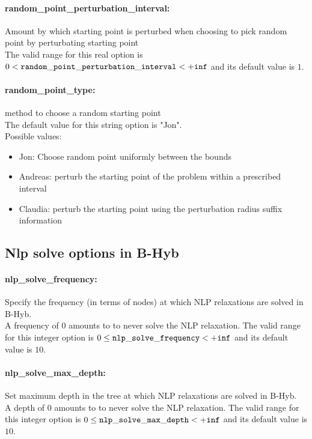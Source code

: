 \paragraph{random\_point\_perturbation\_interval:} Amount by which starting point is perturbed when choosing to pick random point by perturbating starting point $\;$ \\
 The valid range for this real option is 
$0 <  {\tt random\_point\_perturbation\_interval } <  {\tt +inf}$
and its default value is $1$.


\paragraph{random\_point\_type:} method to choose a random starting point $\;$ \\

The default value for this string option is "Jon".
\\ 
Possible values:
\begin{itemize}
   \item Jon: Choose random point uniformly between the bounds
   \item Andreas: perturb the starting point of the problem
within a prescribed interval
   \item Claudia: perturb the starting point using the
perturbation radius suffix information
\end{itemize}

\subsection{Nlp solve options in B-Hyb}
\label{sec:Nlp_solve_options_in_B-Hyb}
\paragraph{nlp\_solve\_frequency:} Specify the frequency (in terms of nodes) at which NLP relaxations are solved in B-Hyb. $\;$ \\
 A frequency of 0 amounts to to never solve the
NLP relaxation. The valid range for this integer option is
$0 \le {\tt nlp\_solve\_frequency } <  {\tt +inf}$
and its default value is $10$.


\paragraph{nlp\_solve\_max\_depth:} Set maximum depth in the tree at which NLP relaxations are solved in B-Hyb. $\;$ \\
 A depth of 0 amounts to to never solve the NLP
relaxation. The valid range for this integer option is
$0 \le {\tt nlp\_solve\_max\_depth } <  {\tt +inf}$
and its default value is $10$.


